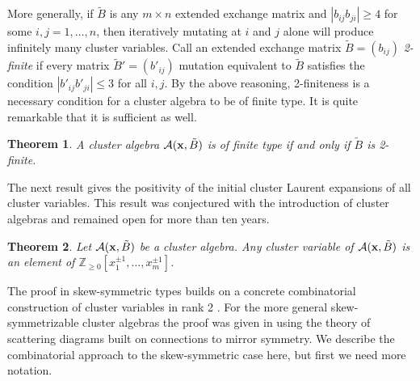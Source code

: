 \documentclass{amsart}
\newtheorem{theorem}{Theorem}[section]
\theoremstyle{definition}
\theoremstyle{remark}
\numberwithin{equation}{section}
\newcommand{\cA}{{\mathcal{A}}}
\newcommand{\x}{{\bf x}}
\newcommand{\bx}{{\bf x}}
\newcommand{\ZZ}{{\mathbb{Z}}}
\begin{document}
    
  More generally, if $\tilde{B}$ is any $m\times n$ extended exchange matrix and $|b_{ij}b_{ji}| \geq 4$ for some $i,j=1,\ldots, n$, then iteratively mutating at $i$ and $j$ alone will produce infinitely many cluster variables.  Call an extended exchange matrix $\tilde B=(b_{ij})$ \emph{2-finite} if every matrix $\tilde B'=(b'_{ij})$ mutation equivalent to $\tilde B$ satisfies the condition $|b'_{ij}b'_{ji}|\le3$ for all $i,j$.  By the above reasoning, 2-finiteness is a necessary condition for a cluster algebra to be of finite type.  It is quite remarkable that it is sufficient as well.
  \begin{theorem}\cite{FZ03}
    A cluster algebra $\cA(\x,\tilde B)$ is of finite type if and only if $\tilde B$ is 2-finite.
  \end{theorem}

  The next result gives the positivity of the initial cluster Laurent expansions of all cluster variables.  This result was conjectured with the introduction of cluster algebras \cite{FZ02} and remained open for more than ten years.  
  \begin{theorem}\cite{LS15,GHKK14}
    Let $\cA(\bx,\tilde B)$ be a cluster algebra.  Any cluster variable of $\cA(\bx,\tilde B)$ is an element of $\ZZ_{\ge0}[x_1^{\pm1},\ldots,x_m^{\pm1}]$.
  \end{theorem}
  The proof in skew-symmetric types builds on a concrete combinatorial construction of cluster variables in rank 2 \cite{LS13,LLZ14}.  For the more general skew-symmetrizable cluster algebras the proof was given in \cite{GHKK14} using the theory of scattering diagrams built on connections to mirror symmetry.  We describe the combinatorial approach to the skew-symmetric case here, but first we need more notation.
\end{document}
